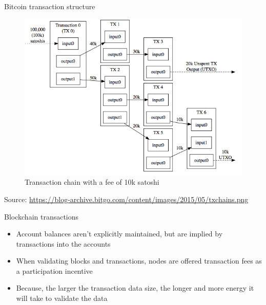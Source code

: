 \documentclass[9pt]{beamer}
\begin{document}
\begin{frame}{Bitcoin transaction structure}
	\begin{figure}[]
		\centering
		\includegraphics  [scale=0.4]{Images/tx-chain}
		\caption{Transaction chain with a fee of 10k satoshi}
	\end{figure}
	\begin{tiny}
		Source: \href{https://blog-archive.bitgo.com/the-challenges-of-block-chain-indexing/}{https://blog-archive.bitgo.com/content/images/2015/05/txchains.png}
	\end{tiny}
\end{frame}


\begin{frame}{Blockchain transactions}
	\begin{itemize}
		\item Account balances aren't explicitly maintained, but are implied by transactions into the accounts
		\item When validating blocks and transactions, nodes are offered transaction fees as a participation incentive
		\item Because, the larger the transaction data size, the longer and more energy it will take to validate the data
	\end{itemize}
\end{frame}

\end{document}
